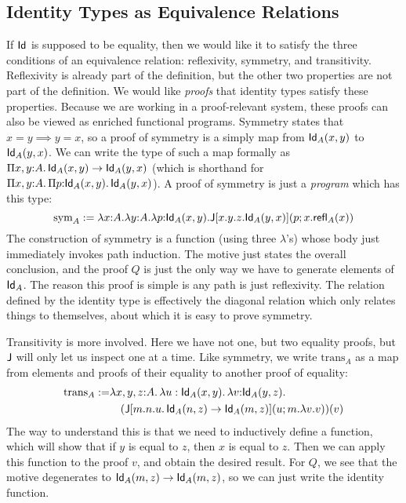 \documentclass[12pt]{article}
\begin{document}
\subsection{Identity Types as Equivalence Relations}
If $\mathsf{Id}_{}$ is supposed to be equality, then we would like it to satisfy the three conditions of an equivalence relation: reflexivity, symmetry, and transitivity. Reflexivity is already part of the definition, but the other two properties are not part of the definition. We would like \emph{proofs} that identity types satisfy these properties. Because we are working in a proof-relevant system, these proofs can also be viewed as enriched functional programs. Symmetry states that $x=y \implies y=x$, so a proof of symmetry is a simply map from $\mathsf{Id}_{A}(x,y)$ to $\mathsf{Id}_{A}(y,x)$. We can write the type of such a map formally as $\Pi x,y{:}A.\, \mathsf{Id}_{A}(x,y) \to \mathsf{Id}_{A}(y,x)$ (which is shorthand for $\Pi x,y{:}A.\, \Pi p{:}\mathsf{Id}_{A}(x,y).\, \mathsf{Id}_{A}(y,x)$). A proof of symmetry is just a \emph{program} which has this type:
\[\text{sym}_A := \lambda x{:}A. \lambda y{:}A. \lambda p{:}\mathsf{Id}_{A}(x,y). \mathsf{J}[x.y.z.\mathsf{Id}_{A}(y,x)](p;x.\mathsf{refl}_{A}(x))\]
The construction of symmetry is a function (using three $\lambda$'s) whose body just immediately invokes path induction. The motive just states the overall conclusion, and the proof $Q$ is just the only way we have to generate elements of $\mathsf{Id}_{A}$. The reason this proof is simple is any path is just reflexivity. The relation defined by the identity type is effectively the diagonal relation which only relates things to themselves, about which it is easy to prove symmetry.

Transitivity is more involved. Here we have not one, but two equality proofs, but $\mathsf{J}$ will only let us inspect one at a time. Like symmetry, we write $\text{trans}_{A}$ as a map from elements and proofs of their equality to another proof of equality:
\begin{alignat*}{2}
\text{trans}_A := &\lambda x,y,z{:}A.\, \lambda u:\mathsf{Id}_{A}(x,y).\, \lambda v{:}\mathsf{Id}_{A}(y,z). \\
                  &\quad(\mathsf{J}[m.n.u.\, \mathsf{Id}_{A}(n,z)\to\mathsf{Id}_{A}(m,z)](u;m.\lambda v. v))(v)
\end{alignat*}
The way to understand this is that we need to inductively define a function, which will show that if $y$ is equal to $z$, then $x$ is equal to $z$. Then we can apply this function to the proof $v$, and obtain the desired result. For $Q$, we see that the motive degenerates to $\mathsf{Id}_{A}(m,z)\to\mathsf{Id}_{A}(m,z)$, so we can just write the identity function.
\end{document}
